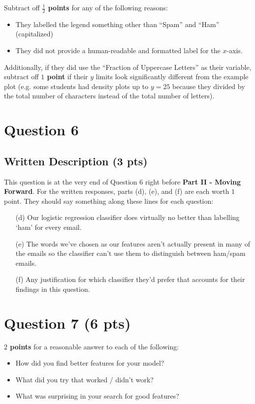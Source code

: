 \documentclass{article}
\begin{document}
Subtract off {\bf $\frac{1}{2}$ points} for any of the following reasons:
\begin{itemize}
\item They labelled the legend something other than ``Spam'' and ``Ham'' (capitalized)
\item They did not provide a human-readable and formatted label for the $x$-axis.
\end{itemize}
Additionally, if they did use the ``Fraction of Uppercase Letters'' as their variable, subtract off {\bf $1$ point} if their $y$ limits look significantly different from the example plot (e.g. some students had density plots up to $y=25$ because they divided by the total number of characters instead of the total number of letters).

\newpage

\section*{Question 6}

\subsection*{Written Description (3 pts)}
This question is at the very end of Question 6 right before {\bf Part II - Moving Forward}. For the written responses, parts (d), (e), and (f) are each worth $1$ point. They should say something along these lines for each question:
\begin{enumerate}
\item[(d)] Our logistic regression classifier does virtually no better than labelling `ham' for every email.
\item[(e)] The words we've chosen as our features aren't actually present in many of the emails so the classifier can't use them to distinguish between ham/spam emails.
\item[(f)] Any justification for which classifier they'd prefer that accounts for their findings in this question.
\end{enumerate}

\section*{Question 7 (6 pts)}

{\bf $2$ points} for a reasonable answer to each of the following:
\begin{itemize}
\item How did you find better features for your model?
\item What did you try that worked / didn't work?
\item What was surprising in your search for good features?
\end{itemize}
\end{document}
